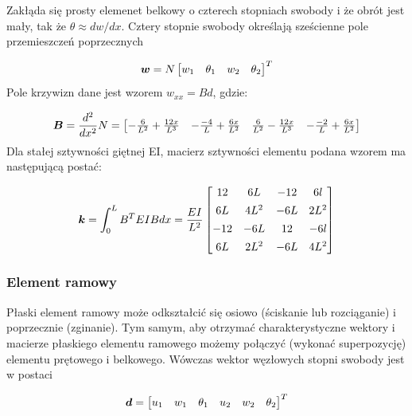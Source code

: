 Zakłąda się prosty elemenet belkowy o czterech stopniach swobody i że obrót \theta  jest mały, tak że
$\theta\approx dw/dx$.
Cztery stopnie swobody określają sześcienne pole przemieszczeń poprzecznych

\begin{equation}
\label{eq:ddaaaasadadddd}
\boldsymbol{w} =
    N\begin{bmatrix}
        w_1 & \theta_1 & w_2 & \theta_2
    \end{bmatrix}^T
\end{equation}
Pole krzywizn dane jest wzorem $w_{xx}=Bd$, gdzie:

\begin{equation}
\label{eq:ddaaaasadad}
\boldsymbol{B} =
    \frac{d^2}{dx^2}N=
    \begin{bmatrix}
        -\frac{6}{L^2}+\frac{12x}{L^3} & -\frac{-4}{L}+\frac{6x}{L^2} & \frac{6}{L^2}-\frac{12x}{L^3} & -\frac{-2}{L}+\frac{6x}{L^2}
    \end{bmatrix}
\end{equation}
Dla stałej sztywności giętnej EI, macierz sztywności elementu podana wzorem  ma następującą postać:

\begin{equation}
\label{eq:ddaaaasadadz}
\boldsymbol{k} =
    \int^L_0 B^T EIBdx=
    \frac{EI}{L^2}
    \begin{bmatrix}
        12 & 6L & -12 & 6l \\[1ex]
        6L & 4L^2 & -6L & 2L^2 \\[1ex]
        -12 & -6L & 12 & -6l \\[1ex]
        6L & 2L^2 & -6L & 4L^2 \\
    \end{bmatrix}
\end{equation}

\subsubsection{Element ramowy}

Płaski element ramowy może odkształcić się osiowo (ściskanie lub rozciąganie) i poprzecznie (zginanie).
Tym samym, aby otrzymać charakterystyczne wektory i macierze płaskiego elementu ramowego możemy połączyć (wykonać superpozycję) elementu prętowego i belkowego.
Wówczas wektor węzłowych stopni swobody jest w postaci

\begin{equation}
\label{eq:ddddd}
\boldsymbol{d} =
    \begin{bmatrix}
        u_1 & w_1 & \theta_1 & u_2 & w_2 & \theta_2
    \end{bmatrix}^T
\end{equation}

